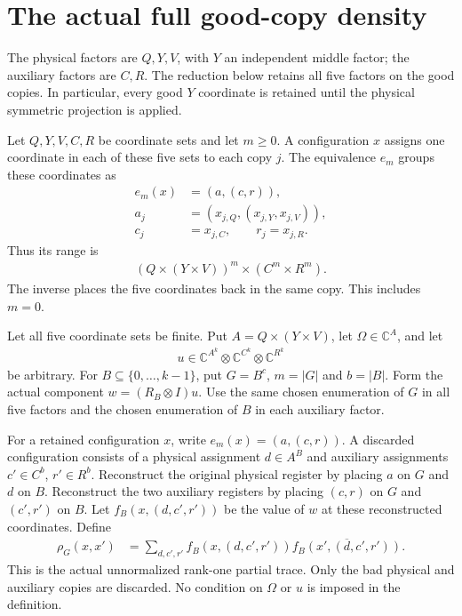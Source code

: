 \section{The actual full good-copy density}
\label{sec:replica_good_configuration_density}

The physical factors are $Q,Y,V$, with $Y$ an independent middle factor;
the auxiliary factors are $C,R$. The reduction below retains all five
factors on the good copies. In particular, every good $Y$ coordinate is
retained until the physical symmetric projection is applied.

\begin{definition}
\label{def:five_factor_copies_equiv}
\leanok
Let $Q,Y,V,C,R$ be coordinate sets and let $m\geq0$. A configuration $x$
assigns one coordinate in each of these five sets to each copy $j$.
The equivalence $e_m$ groups these coordinates as
\begin{align}
 e_m(x)&=(a,(c,r)),\\
 a_j&=(x_{j,Q},(x_{j,Y},x_{j,V})),\\
 c_j&=x_{j,C},\qquad r_j=x_{j,R}.
\end{align}
Thus its range is
\begin{align}
 (Q\times(Y\times V))^m\times(C^m\times R^m).
\end{align}
The inverse places the five coordinates back in the same copy. This
includes $m=0$.
\end{definition}

\begin{definition}
\label{def:replica_good_configuration_marginal}
\leanok
{}
Let all five coordinate sets be finite. Put $A=Q\times(Y\times V)$,
let $\Omega\in\mathbb C^A$, and let
\begin{align}
 u\in\mathbb C^{A^k}\otimes\mathbb C^{C^k}\otimes\mathbb C^{R^k}
\end{align}
be arbitrary. For $B\subseteq\{0,\ldots,k-1\}$, put $G=B^c$,
$m=|G|$ and $b=|B|$. Form the actual component
$w=(R_B\otimes I)u$.
Use the same chosen enumeration of $G$ in all five factors and the chosen
enumeration of $B$ in each auxiliary factor.

For a retained configuration $x$, write $e_m(x)=(a,(c,r))$.
A discarded configuration consists of a physical assignment $d\in A^B$
and auxiliary assignments $c'\in C^b$, $r'\in R^b$.
Reconstruct the original physical register by placing $a$ on $G$ and $d$
on $B$. Reconstruct the two auxiliary registers by placing $(c,r)$ on $G$
and $(c',r')$ on $B$. Let $f_B(x,(d,c',r'))$ be the value of $w$ at
these reconstructed coordinates. Define
\begin{align}
 \rho_G(x,x')
 &=\sum_{d,c',r'} f_B(x,(d,c',r'))
     \overline{f_B(x',(d,c',r'))}.
\end{align}
This is the actual unnormalized rank-one partial trace. Only the bad
physical and auxiliary copies are discarded. No condition on $\Omega$ or
$u$ is imposed in the definition.
\end{definition}

